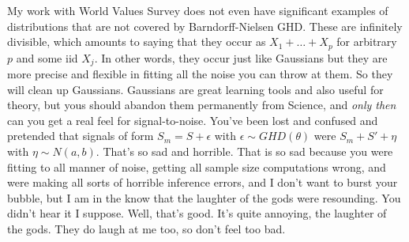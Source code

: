 \documentclass{amsart}
\begin{document}
My work with World Values Survey does not even have significant examples of distributions that are not covered by Barndorff-Nielsen GHD.  These are infinitely divisible, which amounts to saying that they occur as $X_1+\dots+X_p$ for arbitrary $p$ and some iid $X_j$.  In other words, they occur just like Gaussians but they are more precise and flexible in fitting all the noise you can throw at them.  So they will clean up Gaussians.  Gaussians are great learning tools and also useful for theory, but yous should abandon them permanently from Science, and {\em only then} can you get a real feel for signal-to-noise.  You've been lost and confused and pretended that signals of form $ S_m = S + \epsilon$ with $\epsilon \sim GHD(\theta)$ were $S_m + S' + \eta$ with $\eta \sim N(a,b)$.  That's so sad and horrible.  That is so sad because you were fitting to all manner of noise, getting all sample size computations wrong, and were making all sorts of horrible inference errors, and I don't want to burst your bubble, but I am in the know that the laughter of the gods were resounding.  You didn't hear it I suppose.  Well, that's good. It's quite annoying, the laughter of the gods.  They do laugh at me too, so don't feel too bad.  
\end{document}
